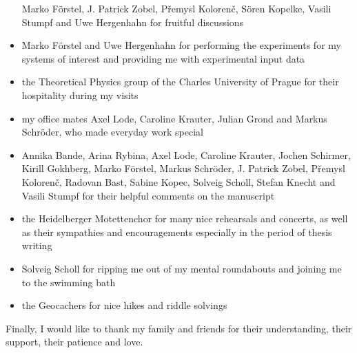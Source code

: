 \begin{itemize}
       Marko Förstel, J. Patrick Zobel,
       P\v{r}emysl Koloren\v{c},
       Sören Kopelke, Vasili Stumpf and Uwe Hergenhahn for fruitful discussions
 \item Marko Förstel and Uwe Hergenhahn for performing the experiments
       for my systems of interest and providing me with experimental input data
 \item the Theoretical Physics group of the Charles University of Prague for
       their hospitality during my visits
 \item my office mates Axel Lode, Caroline Krauter, Julian Grond and Markus
       Schröder, who made everyday work special
 \item Annika Bande, Arina Rybina, Axel Lode, Caroline Krauter, Jochen Schirmer,
       Kirill Gokhberg, Marko Förstel,
       Markus Schröder, J. Patrick Zobel, P\v{r}emysl Koloren\v{c},
       Radovan Bast, Sabine Kopec, Solveig Scholl, Stefan Knecht
       and Vasili Stumpf for their helpful comments on the manuscript
 \item the Heidelberger Motettenchor for many nice rehearsals and concerts,
       as well as their sympathies and encouragements especially in the period
       of thesis writing
 \item Solveig Scholl for ripping me out of my mental roundabouts and
       joining me to the swimming bath
 \item the Geocachers for nice hikes and riddle solvings
\end{itemize}

Finally, I would like to thank my family and friends for their understanding,
their support, their patience and love.
